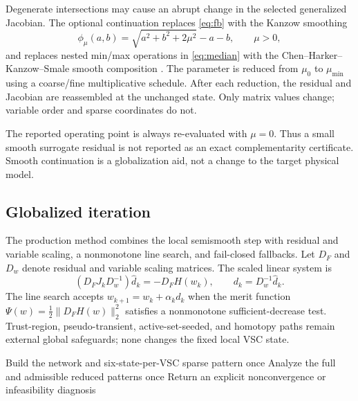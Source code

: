 Degenerate intersections may cause an abrupt change in the selected
generalized Jacobian. The optional continuation replaces
\eqref{eq:fb} with the Kanzow smoothing
\begin{equation}
 \phi_{\mu}(a,b)
 =\sqrt{a^2+b^2+2\mu^2}-a-b,
 \qquad \mu>0,
 \label{eq:smooth-fb}
\end{equation}
and replaces nested min/max operations in \eqref{eq:median} with the
Chen--Harker--Kanzow--Smale smooth composition
\cite{kanzow1996continuation}. The parameter is reduced from $\mu_0$ to
$\mu_{\min}$ using a coarse/fine multiplicative schedule. After each reduction,
the residual and Jacobian are reassembled at the unchanged state. Only matrix
values change; variable order and sparse coordinates do not.

The reported operating point is always re-evaluated with $\mu=0$. Thus a small
smooth surrogate residual is not reported as an exact complementarity
certificate. Smooth continuation is a globalization aid, not a change to the
target physical model.

\subsection{Globalized iteration}

The production method combines the local semismooth step with residual and
variable scaling, a nonmonotone line search, and fail-closed fallbacks. Let
$D_F$ and $D_w$ denote residual and variable scaling matrices. The scaled
linear system is
\begin{equation}
 (D_FJ_kD_w^{-1})\widehat d_k=-D_FH(w_k),\qquad
 d_k=D_w^{-1}\widehat d_k.
 \label{eq:scaled-newton}
\end{equation}
The line search accepts $w_{k+1}=w_k+\alpha_k d_k$ when the merit function
$\Psi(w)=\tfrac12\|D_FH(w)\|_2^2$ satisfies a nonmonotone sufficient-decrease
test. Trust-region, pseudo-transient, active-set-seeded, and homotopy paths
remain external global safeguards; none changes the fixed local VSC state.

\begin{algorithm}[t]
\caption{Structure-preserving semismooth Newton solve}
\label{alg:ssn}
Build the network and six-state-per-VSC sparse pattern once\;
Analyze the full and admissible reduced patterns once\;
Return an explicit nonconvergence or infeasibility diagnosis\;
\end{algorithm}

